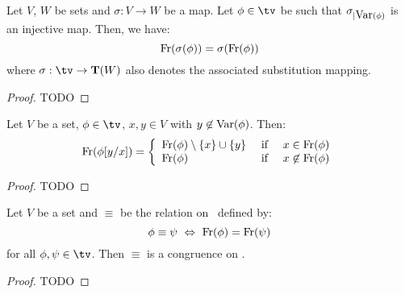 \begin{prop}\label{logic:prop:LAM:freevar:of:substitution}
    Let $V$, $W$ be sets and $\sigma:V\to W$ be a map. Let $\phi\in\tv$ 
    be such that $\sigma_{|\mbox{\rm Var}(\phi)}$ is an injective map. Then, we have:
    \[
        \mbox{\rm Fr}(\sigma(\phi))=\sigma(\mbox{\rm Fr}(\phi))
    \]
    where $\sigma:\tv\to{\bf T}(W)$ also denotes the associated substitution 
    mapping.
\end{prop}
\begin{proof}
TODO
\end{proof}

\begin{prop}\label{logic:prop:LAM:freevar:single:subst}
    Let $V$ be a set, $\phi\in\tv$, $x,y\in V$ with $y\not\in\mbox{\rm Var}(\phi)$. Then:
    \[
        \mbox{\rm Fr}(\phi[y/x])=
            \left\{\begin{array}{lcl}
                \mbox{\rm Fr}(\phi)\setminus\{x\}\cup\{y\}
                    &\mbox{\ if\ }&
                x\in\mbox{\rm Fr}(\phi)
                \\
                \mbox{\rm Fr}(\phi)
                    &\mbox{\ if\ }&
                x\not\in\mbox{\rm Fr}(\phi)
            \end{array}\right.
    \]
\end{prop}
\begin{proof}
TODO
\end{proof}

\begin{prop}\label{logic:prop:LAM:congruence:freevar}
Let $V$ be a set and $\equiv$ be the relation on \tv\ defined by:
    \[
    \phi\equiv\psi\ \Leftrightarrow\ \free(\phi)=\free(\psi)
    \]
for all $\phi,\psi\in\tv$. Then $\equiv$ is a congruence on \tv.
\end{prop}
\begin{proof}
TODO
\end{proof}



